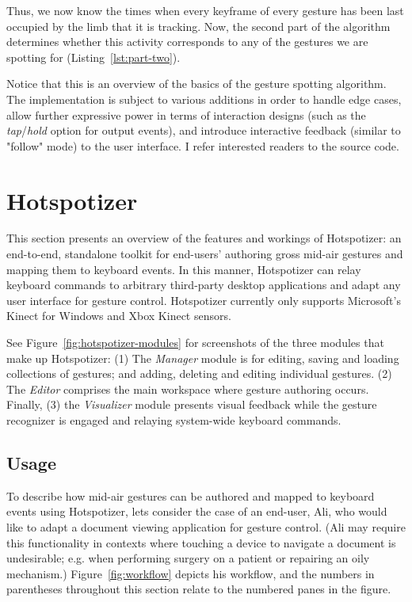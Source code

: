 Thus, we now know the times when every keyframe of every gesture has been last occupied by the limb that it is tracking. Now, the second part of the algorithm determines whether this activity corresponds to any of the gestures we are spotting for (Listing~\ref{lst:part-two}).

Notice that this is an overview of the basics of the gesture spotting algorithm. The implementation is subject to various additions in order to handle edge cases, allow further expressive power in terms of interaction designs (such as the \emph{tap}/\emph{hold} option for output events), and introduce interactive feedback (similar to  "follow" mode) to the user interface. I refer interested readers to the source code.

\section{Hotspotizer}
\label{sec:hotspotizer}

This section presents an overview of the features and workings of Hotspotizer: an end-to-end, standalone toolkit for end-users' authoring gross mid-air gestures and mapping them to keyboard events. In this manner, Hotspotizer can relay keyboard commands to arbitrary third-party desktop applications and adapt any user interface for gesture control. Hotspotizer currently only supports Microsoft's Kinect for Windows and Xbox Kinect sensors.

See Figure~\ref{fig:hotspotizer-modules} for screenshots of the three modules that make up Hotspotizer: (1) The \emph{Manager} module is for editing, saving and loading collections of gestures; and adding, deleting and editing individual gestures. (2) The \emph{Editor} comprises the main workspace where gesture authoring occurs. Finally, (3) the \emph{Visualizer} module presents visual feedback while the gesture recognizer is engaged and relaying system-wide keyboard commands.

\subsection{Usage}

To describe how mid-air gestures can be authored and mapped to keyboard events using Hotspotizer, lets consider the case of an end-user, Ali, who would like to adapt a document viewing application for gesture control. (Ali may require this functionality in contexts where touching a device to navigate a document is undesirable; e.g. when performing surgery on a patient or repairing an oily mechanism.) Figure~\ref{fig:workflow} depicts his workflow, and the numbers in parentheses throughout this section relate to the numbered panes in the figure.


